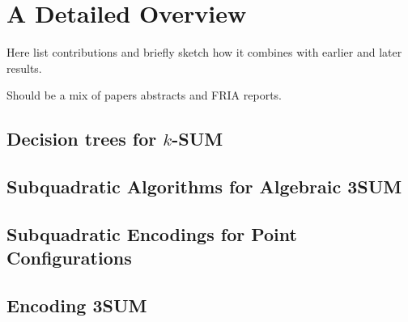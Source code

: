 \chapter{A Detailed Overview}

Here list contributions and briefly sketch how it combines with earlier and
later results.

Should be a mix of papers abstracts and FRIA reports.


\section{Decision trees for \(k\)-SUM}




\section{Subquadratic Algorithms for Algebraic 3SUM}




\section{Subquadratic Encodings for Point Configurations}




\section{Encoding 3SUM}


